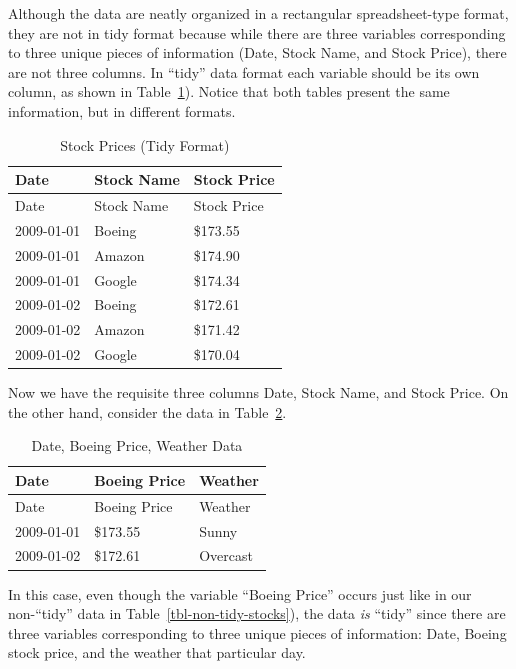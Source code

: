 \documentclass[
  letterpaper,
  DIV=11,
  numbers=noendperiod]{scrreprt}
\theoremstyle{definition}
\theoremstyle{remark}
\begin{document}
Although the data are neatly organized in a rectangular spreadsheet-type
format, they are not in tidy format because while there are three
variables corresponding to three unique pieces of information (Date,
Stock Name, and Stock Price), there are not three columns. In ``tidy''
data format each variable should be its own column, as shown in
Table~\ref{tbl-tidy-stocks}). Notice that both tables present the same
information, but in different formats.

\hypertarget{tbl-tidy-stocks}{}
\begin{longtable}[]{@{}lll@{}}
\caption{\label{tbl-tidy-stocks}Stock Prices (Tidy
Format)}\tabularnewline
\toprule()
Date & Stock Name & Stock Price \\
\midrule()
\endfirsthead
\toprule()
Date & Stock Name & Stock Price \\
\midrule()
\endhead
2009-01-01 & Boeing & \$173.55 \\
2009-01-01 & Amazon & \$174.90 \\
2009-01-01 & Google & \$174.34 \\
2009-01-02 & Boeing & \$172.61 \\
2009-01-02 & Amazon & \$171.42 \\
2009-01-02 & Google & \$170.04 \\
\bottomrule()
\end{longtable}

Now we have the requisite three columns Date, Stock Name, and Stock
Price. On the other hand, consider the data in
Table~\ref{tbl-tidy-stocks-2}.

\hypertarget{tbl-tidy-stocks-2}{}
\begin{longtable}[]{@{}lll@{}}
\caption{\label{tbl-tidy-stocks-2}Date, Boeing Price, Weather
Data}\tabularnewline
\toprule()
Date & Boeing Price & Weather \\
\midrule()
\endfirsthead
\toprule()
Date & Boeing Price & Weather \\
\midrule()
\endhead
2009-01-01 & \$173.55 & Sunny \\
2009-01-02 & \$172.61 & Overcast \\
\bottomrule()
\end{longtable}

In this case, even though the variable ``Boeing Price'' occurs just like
in our non-``tidy'' data in Table~\ref{tbl-non-tidy-stocks}), the data
\emph{is} ``tidy'' since there are three variables corresponding to
three unique pieces of information: Date, Boeing stock price, and the
weather that particular day.
\end{document}
